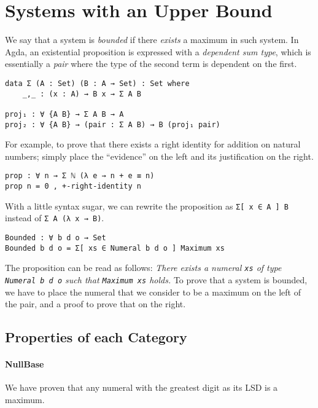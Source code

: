 \documentclass[\main/thesis.tex]{subfiles}
\begin{document}
\section{Systems with an Upper Bound}\label{bounded}

We say that a system is \textit{bounded} if there \textit{exists} a maximum in
such system. In Agda, an existential proposition is expressed with
a \textit{dependent sum type}, which is essentially a \textit{pair} where the
type of the second term is dependent on the first.

\begin{lstlisting}
data Σ (A : Set) (B : A → Set) : Set where
    _,_ : (x : A) → B x → Σ A B

proj₁ : ∀ {A B} → Σ A B → A
proj₂ : ∀ {A B} → (pair : Σ A B) → B (proj₁ pair)
\end{lstlisting}

For example, to prove that there exists a right identity for addition on natural numbers;
simply place the ``evidence'' on the left and its justification on the right.

\begin{lstlisting}
prop : ∀ n → Σ ℕ (λ e → n + e ≡ n)
prop n = 0 , +-right-identity n
\end{lstlisting}

With a little syntax sugar,  we can rewrite the proposition as
{\lstinline|Σ[ x ∈ A ] B|} instead of {\lstinline|Σ A (λ x → B)|}.

\begin{lstlisting}
Bounded : ∀ b d o → Set
Bounded b d o = Σ[ xs ∈ Numeral b d o ] Maximum xs
\end{lstlisting}

The proposition can be read as follows:
\textit{There exists a numeral {\lstinline|xs|} of type {\lstinline|Numeral b d o|}
such that {\lstinline|Maximum xs|} holds.}
To prove that a system is bounded, we have to place the numeral that we consider
to be a maximum on the left of the pair, and a proof to prove that on the right.

\subsection{Properties of each Category}

\paragraph{NullBase}

We have proven that any numeral with the greatest digit as its LSD is a maximum.
\end{document}
